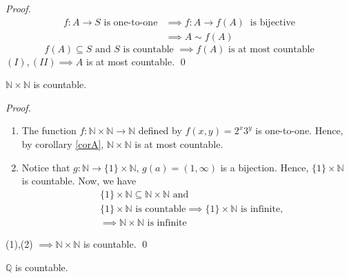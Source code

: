\begin{proof}
    \begin{align*}
        f:A \rightarrow S \text{ is one-to-one}
        &\implies f:A \rightarrow f(A) ~\text{ is bijective} \\
        &\implies A \sim f(A)
        \tag{$I$}
    \end{align*}
    \begin{equation*}
        f(A) \subseteq S \text{ and } S \text{ is countable }  \implies f(A) \text{ is at most countable}
        \tag{$II$}
    \end{equation*}
	$(I), (II) \implies A$ is at most countable. \qed
\end{proof}

\begin{example}
    $\mathbb{N} \times \mathbb{N}$ is countable.
\end{example}

\begin{proof}
    \begin{enumerate}[$(1)$]
        \item The function $f: \mathbb{N} \times \mathbb{N} \rightarrow \mathbb{N}$ defined by $f(x,y) = 2^x3^y$ is one-to-one. Hence, by corollary \ref{corA}, $\mathbb{N} \times \mathbb{N}$ is at most countable.
        \item Notice that $g:\mathbb{N} \rightarrow \{1\} \times \mathbb{N}$, $g(a) = (1, \infty)$ is a bijection. Hence, $\{1\}\times \mathbb{N}$ is countable. Now, we have
        \begin{align*} &\{1\} \times \mathbb{N} \subseteq \mathbb{N}\times \mathbb{N} \text{ and } \\ &\{1\} \times \mathbb{N} \text{ is countable} \implies \{1\} \times \mathbb{N} \text{ is infinite,} \\ &\implies \mathbb{N} \times \mathbb{N} \text{ is infinite}
        \end{align*}
    \end{enumerate}
    (1),(2) $\implies \mathbb{N} \times \mathbb{N}$ is countable. \qed
\end{proof}

\begin{example}
    $\mathbb{Q}$ is countable.
\end{example}

